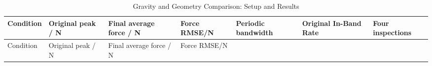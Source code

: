 \FloatBarrier\begingroup\small\setlength{\tabcolsep}{2.5pt}
\begin{longtable}[]{@{}
  >{\raggedright\arraybackslash}p{}
  >{\raggedright\arraybackslash}p{}
  >{\raggedright\arraybackslash}p{}
  >{\raggedright\arraybackslash}p{}
  >{\raggedright\arraybackslash}p{}
  >{\raggedright\arraybackslash}p{}
  >{\raggedright\arraybackslash}p{}@{}}
\caption{Gravity and Geometry Comparison: Setup and Results}\label{tab:s13-2}\tabularnewline
\toprule\noalign{}
\begin{minipage}[b]{\linewidth}\raggedright
Condition
\end{minipage} & \begin{minipage}[b]{\linewidth}\raggedright
Original peak / N
\end{minipage} & \begin{minipage}[b]{\linewidth}\raggedright
Final average force / N
\end{minipage} & \begin{minipage}[b]{\linewidth}\raggedright
Force RMSE/N
\end{minipage} & \begin{minipage}[b]{\linewidth}\raggedright
Periodic bandwidth
\end{minipage} & \begin{minipage}[b]{\linewidth}\raggedright
Original In-Band Rate
\end{minipage} & \begin{minipage}[b]{\linewidth}\raggedright
Four inspections
\end{minipage} \\
\midrule\noalign{}
\endfirsthead
\toprule\noalign{}
\begin{minipage}[b]{\linewidth}\raggedright
Condition
\end{minipage} & \begin{minipage}[b]{\linewidth}\raggedright
Original peak / N
\end{minipage} & \begin{minipage}[b]{\linewidth}\raggedright
Final average force / N
\end{minipage} & \begin{minipage}[b]{\linewidth}\raggedright
Force RMSE/N
\end{minipage} & \begin{minipage}[b]{\linewidth}\raggedright

\end{minipage}
\end{longtable}
